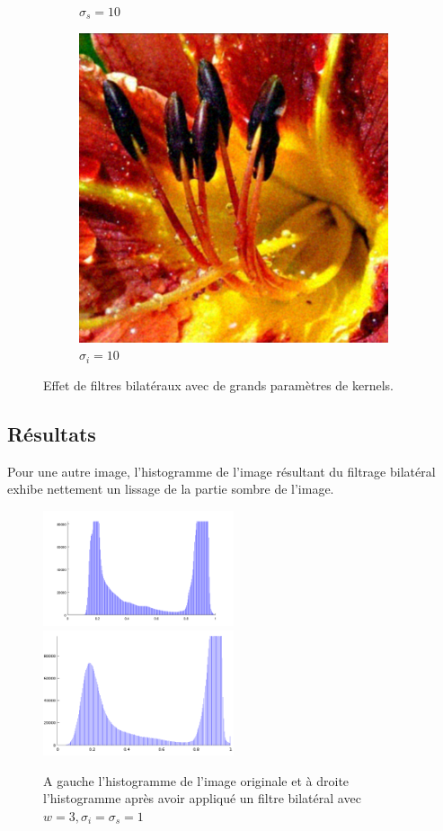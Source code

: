 \documentclass{article}
\begin{document}
\begin{figure}
\begin{subfigure}[b]{0.3\textwidth}
        \caption{$\sigma_s = 10$}
    \end{subfigure}
    \begin{subfigure}[b]{0.3\textwidth}
        \includegraphics[width=\textwidth]{bilateral1_10.png}
        \caption{$\sigma_i = 10$}
    \end{subfigure}
    \caption{Effet de filtres bilatéraux avec de grands paramètres de kernels.}
\end{figure}
\newpage
\subsection*{Résultats}
Pour une autre image, l'histogramme de l'image résultant du filtrage bilatéral exhibe nettement un lissage de la partie sombre de l'image.
\begin{figure}[ht]
	\includegraphics[width=0.5\textwidth]{hist_orig.png}
	\includegraphics[width=0.5\textwidth]{hist_eq.png}
  \caption{A gauche l'histogramme de l'image originale et à droite l'histogramme après avoir appliqué un filtre bilatéral avec $w=3, \sigma_i = \sigma_s = 1$ }
\end{figure}
\end{document}
